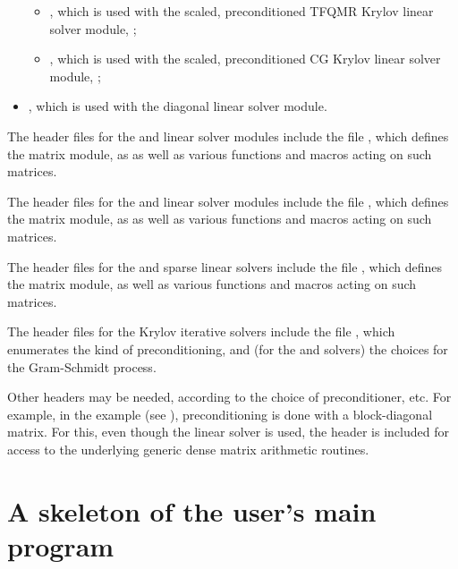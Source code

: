 \begin{itemize}
\begin{itemize}
  \item {},
    which is used with the scaled, preconditioned TFQMR Krylov linear
    solver module, {\sunlinsolsptfqmr};

  \item {},
    which is used with the scaled, preconditioned CG Krylov linear
    solver module, {\sunlinsolpcg};
  \end{itemize}
\item {},
  which is used with the {\cvdiag} diagonal linear solver module.
\end{itemize}

The header files for the {\sunlinsoldense} and {\sunlinsollapdense}
linear solver modules include the file
, which defines the {\sunmatdense}
matrix module, as as well as various functions and macros acting on
such matrices.

The header files for the {\sunlinsolband} and {\sunlinsollapband}
linear solver modules include the file
, which defines the {\sunmatband}
matrix module, as as well as various functions and macros acting on
such matrices.

The header files for the {\sunlinsolklu} and {\sunlinsolslumt}
sparse linear solvers include the file
, which defines the {\sunmatsparse}
matrix module, as well as various functions and macros acting on such
matrices.

The header files for the Krylov iterative solvers include the file
, which enumerates the kind of
preconditioning, and (for the {\spgmr} and {\spfgmr} solvers) the
choices for the Gram-Schmidt process.

Other headers may be needed, according to the choice of
preconditioner, etc.  For example, in the 
example (see \cite{cvodes_ex}), preconditioning is done with a
block-diagonal matrix. For this, even though the {\sunlinsolspgmr}
linear solver is used, the header  is
included for access to the underlying generic dense matrix arithmetic
routines.

\section{A skeleton of the user's main program}\label{ss:skeleton_sim}

